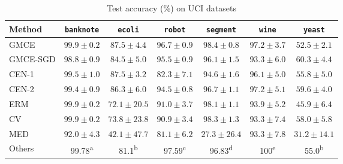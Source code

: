 \documentclass[runningheads, envcountsame, a4paper]{llncs}
\begin{document}
			\begin{table*}[t]
				\caption{Test accuracy (\%) on UCI datasets}
				\label{tab:uci_experiments}
				\centering
				\begin{tabular}{lcccccc}	
					Method         & \texttt{banknote}       & \texttt{ecoli}          & \texttt{robot}          & \texttt{segment}        & \texttt{wine}           & \texttt{yeast}          \\
					\midrule
					G\gls{MCE}     & $\mathbf{99.9 \pm 0.2}$ & $\mathbf{87.5 \pm 4.4}$ & $\mathbf{96.7 \pm 0.9}$ & $\mathbf{98.4 \pm 0.8}$ & $\mathbf{97.2 \pm 3.7}$ & $52.5 \pm 2.1$          \\
					G\gls{MCE}-SGD & $98.8 \pm 0.9$          & $84.5 \pm 5.0$          & $95.5 \pm 0.9$          & $96.1 \pm 1.5$          & $93.3 \pm 6.0$          & $\mathbf{60.3 \pm 4.4}$ \\
					\gls{CEN}-1    & $99.5 \pm 1.0$          & $\mathbf{87.5 \pm 3.2}$ & $82.3 \pm 7.1$          & $94.6 \pm 1.6$          & $96.1 \pm 5.0$          & $55.8 \pm 5.0$          \\
					\gls{CEN}-2    & $99.4 \pm 0.9$          & $86.3 \pm 6.0$          & $94.5 \pm 0.8$          & $96.7 \pm 1.1$          & $97.2 \pm 5.1$          & $59.6 \pm 4.0$          \\
					ERM            & $\mathbf{99.9 \pm 0.2}$ & $72.1 \pm 20.5$         & $91.0 \pm 3.7$          & $98.1 \pm 1.1$          & $93.9 \pm 5.2$          & $45.9 \pm 6.4$          \\
					CV             & $\mathbf{99.9 \pm 0.2}$ & $73.8 \pm 23.8$         & $90.9 \pm 3.4$          & $98.3 \pm 1.3$          & $93.3 \pm 7.4$          & $58.0 \pm 5.8$          \\
					MED            & $92.0 \pm 4.3$          & $42.1 \pm 47.7$         & $81.1 \pm 6.2$          & $27.3 \pm 26.4$         & $93.3 \pm 7.8$          & $31.2 \pm 14.1$         \\
					Others         & 99.78\textsuperscript{a}& 81.1\textsuperscript{b} & 97.59\textsuperscript{c}& 96.83\textsuperscript{d}& 100\textsuperscript{e}  & 55.0\textsuperscript{b}
				\end{tabular}
			\end{table*}
		
\end{document}
